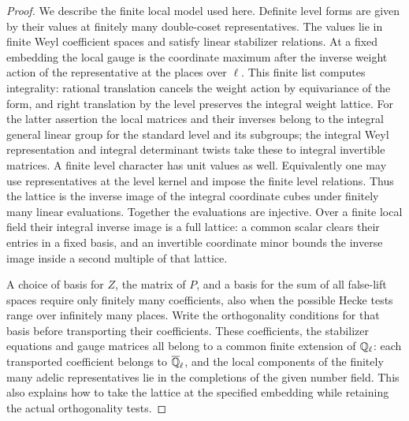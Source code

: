 \documentclass[a4paper,11pt]{article}
\theoremstyle{definition}
\theoremstyle{remark}
\numberwithin{equation}{section}
\begin{document}
\begin{proof}
We describe the finite local model used here. Definite
level forms are given by their values at finitely many
double-coset representatives. The values lie in finite
Weyl coefficient spaces and satisfy linear stabilizer
relations. At a fixed embedding the local gauge is the
coordinate maximum after the inverse weight action of
the representative at the places over \(\ell\). This finite
list computes integrality: rational translation cancels
the weight action by equivariance of the form, and right
translation by the level preserves the integral weight
lattice. For the latter assertion the local matrices
and their inverses belong to the integral general linear
group for the standard level and its subgroups; the
integral Weyl representation and integral determinant
twists take these to integral invertible matrices.
A finite level character has unit values as well.
Equivalently one may use representatives at the level
kernel and impose the finite level relations.
Thus the lattice is the inverse image of the integral
coordinate cubes under finitely many linear evaluations.
Together the evaluations are injective. Over a finite
local field their integral inverse image is a full
lattice: a common scalar clears their entries in a fixed
basis, and an invertible coordinate minor bounds the
inverse image inside a second multiple of that lattice.

A choice of basis for \(Z\), the matrix of \(P\), and a
basis for the sum of all false-lift spaces require only
finitely many coefficients, also when the possible
Hecke tests range over infinitely many places. Write
the orthogonality conditions for that basis before
transporting their coefficients. These coefficients,
the stabilizer equations and gauge matrices all belong
to a common finite extension of \(\mathbb Q_\ell\): each
transported coefficient belongs to \(\overline{\mathbb Q}_\ell\),
and the local components of the finitely many adelic
representatives lie in the completions of the given
number field. This also explains how to take the lattice
at the specified embedding while retaining the actual
orthogonality tests.


\end{proof}
\end{document}
